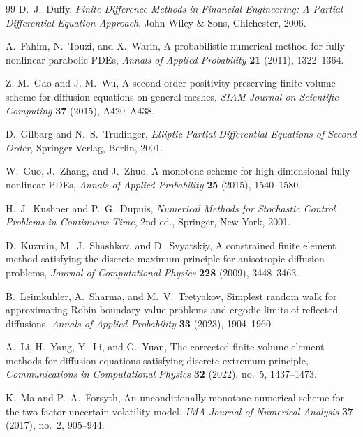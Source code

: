 \documentclass[11pt]{article}
\theoremstyle{definition}
\theoremstyle{remark}
\begin{document}
\begin{thebibliography}{99}
		D.~J.~Duffy,
		\emph{Finite Difference Methods in Financial Engineering: A Partial Differential Equation Approach},
		John Wiley \& Sons, Chichester, 2006.
		
		A.~Fahim, N.~Touzi, and X.~Warin,
		A probabilistic numerical method for fully nonlinear parabolic PDEs,
		\emph{Annals of Applied Probability} \textbf{21} (2011), 1322--1364.
		
		Z.-M.~Gao and J.-M.~Wu,
		A second-order positivity-preserving finite volume scheme for diffusion equations on general meshes,
		\emph{SIAM Journal on Scientific Computing} \textbf{37} (2015), A420--A438.
		
		D.~Gilbarg and N.~S.~Trudinger,
		\emph{Elliptic Partial Differential Equations of Second Order},
		Springer-Verlag, Berlin, 2001.
		
		W.~Guo, J.~Zhang, and J.~Zhuo,
		A monotone scheme for high-dimensional fully nonlinear PDEs,
		\emph{Annals of Applied Probability} \textbf{25} (2015), 1540--1580.
		
		H.~J.~Kushner and P.~G.~Dupuis,
		\emph{Numerical Methods for Stochastic Control Problems in Continuous Time},
		2nd ed., Springer, New York, 2001.
		
		D.~Kuzmin, M.~J.~Shashkov, and D.~Svyatskiy,
		A constrained finite element method satisfying the discrete maximum principle for anisotropic diffusion problems,
		\emph{Journal of Computational Physics} \textbf{228} (2009), 3448--3463.
		
		B.~Leimkuhler, A.~Sharma, and M.~V.~Tretyakov,
		Simplest random walk for approximating Robin boundary value problems and ergodic limits of reflected diffusions,
		\emph{Annals of Applied Probability} \textbf{33} (2023), 1904--1960.
		
		A.~Li, H.~Yang, Y.~Li, and G.~Yuan,
		The corrected finite volume element methods for diffusion equations satisfying discrete extremum principle,
		\emph{Communications in Computational Physics} \textbf{32} (2022), no.~5, 1437--1473.
		
		K.~Ma and P.~A.~Forsyth,
		An unconditionally monotone numerical scheme for the two-factor uncertain volatility model,
		\emph{IMA Journal of Numerical Analysis} \textbf{37} (2017), no.~2, 905--944.
		

\end{thebibliography}
\end{document}
